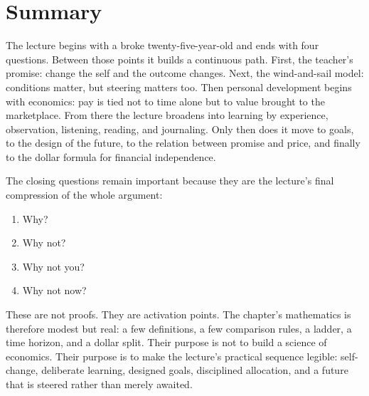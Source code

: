 \section{Summary}

The lecture begins with a broke twenty-five-year-old and ends with four questions. Between those points it builds a continuous path. First, the teacher's promise: change the self and the outcome changes. Next, the wind-and-sail model: conditions matter, but steering matters too. Then personal development begins with economics: pay is tied not to time alone but to value brought to the marketplace. From there the lecture broadens into learning by experience, observation, listening, reading, and journaling. Only then does it move to goals, to the design of the future, to the relation between promise and price, and finally to the dollar formula for financial independence.

The closing questions remain important because they are the lecture's final compression of the whole argument:
\begin{enumerate}
\item Why?
\item Why not?
\item Why not you?
\item Why not now?
\end{enumerate}
These are not proofs. They are activation points. The chapter's mathematics is therefore modest but real: a few definitions, a few comparison rules, a ladder, a time horizon, and a dollar split. Their purpose is not to build a science of economics. Their purpose is to make the lecture's practical sequence legible: self-change, deliberate learning, designed goals, disciplined allocation, and a future that is steered rather than merely awaited.